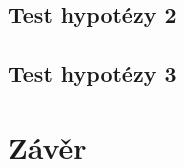 \documentclass[11pt, a4paper]{article}
\begin{document}
\newpage

\subsection{Test hypotézy 2}

\subsection{Test hypotézy 3}

\section{Závěr}



    
\end{document}
